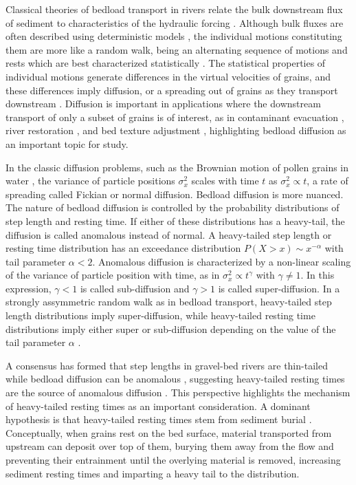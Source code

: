 \documentclass[draft]{agujournal2018}
\begin{document}
Classical theories of bedload transport in rivers relate the bulk downstream flux of sediment to characteristics of the hydraulic forcing \citep[e.g.][]{Yalin1972}.
Although bulk fluxes are often described using deterministic models \citep[e.g.]{Wilcock2003}, the individual motions constituting them are more like a random walk, being an alternating sequence of motions and rests which are best characterized statistically \citep[e.g.][]{Einstein1937}.
The statistical properties of individual motions generate differences in the virtual velocities of grains, and these differences imply diffusion, or a spreading out of grains as they transport downstream \citep{Einstein1937, Yano1969, Nakagawa1976}.
Diffusion is important in applications where the downstream transport of only a subset of grains is of interest, as in contaminant evacuation \citep{Malmon2005}, river restoration \citep{Gaeuman2017}, and bed texture adjustment \citep{Hassan2017}, highlighting bedload diffusion as an important topic for study.
 
In the classic diffusion problems, such as the Brownian motion of pollen grains in water \citep[e.g.][]{Einstein1905}, the variance of particle positions $\sigma_x^2$ scales with time $t$ as $\sigma_x^2 \propto t$, a rate of spreading called Fickian or normal diffusion.
Bedload diffusion is more nuanced.
The nature of bedload diffusion is controlled by the probability distributions of step length and resting time.
If either of these distributions has a heavy-tail, the diffusion is called anomalous instead of normal. 
A heavy-tailed step length or resting time distribution has an exceedance distribution $P(X>x) \sim x^{-\alpha}$ with tail parameter $\alpha < 2$.
Anomalous diffusion is characterized by a non-linear scaling of the variance of particle position with time, as in $\sigma_x^2 \propto t^\gamma$ with $\gamma\neq 1$.
In this expression, $\gamma <1$ is called sub-diffusion and $\gamma > 1$ is called super-diffusion.
In a strongly assymmetric random walk as in bedload transport, heavy-tailed step length distributions imply super-diffusion, while heavy-tailed resting time distributions imply either super or sub-diffusion depending on the value of the tail parameter $\alpha$ \citep{Weeks1998}.

A consensus has formed that step lengths in gravel-bed rivers are thin-tailed \citep{Hassan2013, Bradley2017} while bedload diffusion can be anomalous \citep{Nikora2002, Bradley2010, Martin2012, Zhang2012, Phillips2013, Fan2017}, suggesting heavy-tailed resting times are the source of anomalous diffusion \citep{Martin2012, Bradley2017}.
This perspective highlights the mechanism of heavy-tailed resting times as an important consideration.
A dominant hypothesis is that heavy-tailed resting times stem from sediment burial \citep[e.g.][]{Voepel2013, Martin2014, Bradley2017}.
Conceptually, when grains rest on the bed surface, material transported from upstream can deposit over top of them, burying them away from the flow and preventing their entrainment until the overlying material is removed, increasing sediment resting times and imparting a heavy tail to the distribution.
\end{document}
